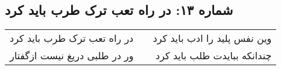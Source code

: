 \begin{center}
\section*{شماره ۱۳: در راه تعب ترک طرب باید کرد}
\label{sec:013}
\begin{longtable}{l p{0.5cm} r}
در راه تعب ترک طرب باید کرد
&&
وین نفس پلید را ادب باید کرد
\\
ور در طلبی دریغ نیست ازگفتار
&&
چندانکه ببایدت طلب باید کرد
\\
\end{longtable}
\end{center}
